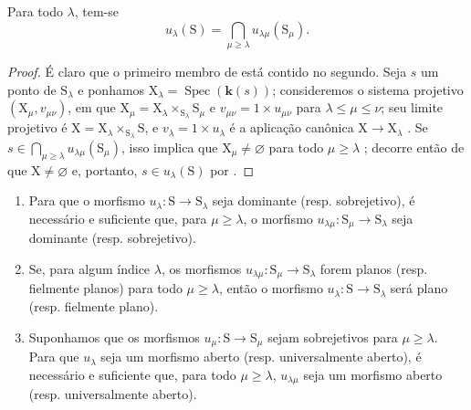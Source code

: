 \begin{corollary}[8.3.7]
\label{IV.8.3.7}
Para todo $\lambda$, tem-se
\begin{equation}
  u_\lambda(\mathrm{S})=\bigcap_{\mu\geqslant\lambda}u_{\lambda\mu}(\mathrm{S}_\mu).
  \tag{8.3.7.1}
\label{IV.8.3.7.1}
\end{equation}
\end{corollary}

\begin{proof}
É claro que o primeiro membro de  está contido no segundo.
Seja $s$ um ponto de $\mathrm{S}_\lambda$ e ponhamos $\mathrm{X}_\lambda=\operatorname{Spec}(\boldsymbol{k}(s))$; consideremos o sistema projetivo $(\mathrm{X}_\mu,v_{\mu\nu})$, em que $\mathrm{X}_\mu=\mathrm{X}_\lambda\times_{\mathrm{S}_\lambda}\mathrm{S}_\mu$ e $v_{\mu\nu}=1\times u_{\mu\nu}$ para $\lambda\leqslant\mu\leqslant\nu$; seu limite projetivo é $\mathrm{X}=\mathrm{X}_\lambda\times_{\mathrm{S}_\lambda}\mathrm{S}$, e $v_\lambda=1\times u_\lambda$ é a aplicação canônica $\mathrm{X}\to\mathrm{X}_\lambda$ .
Se $s\in\bigcap_{\mu\geqslant\lambda}u_{\lambda\mu}(\mathrm{S}_\mu)$, isso implica que $\mathrm{X}_\mu\neq\varnothing$ para todo $\mu\geqslant\lambda$ ; decorre então de  que $\mathrm{X}\neq\varnothing$ e, portanto, $s\in u_\lambda(\mathrm{S})$ por .
\end{proof}

\begin{proposition}[8.3.8]
\label{IV.8.3.8}
\begin{enumerate}[label=(\roman*)]
  \item Para que o morfismo $u_\lambda:\mathrm{S}\to\mathrm{S}_\lambda$ seja dominante (resp. sobrejetivo), é necessário e suficiente que, para $\mu\geqslant\lambda$, o morfismo $u_{\lambda\mu}:\mathrm{S}_\mu\to\mathrm{S}_\lambda$ seja dominante (resp. sobrejetivo).
  \item Se, para algum índice $\lambda$, os morfismos $u_{\lambda\mu}:\mathrm{S}_\mu\to\mathrm{S}_\lambda$ forem planos (resp. fielmente planos) para todo $\mu\geqslant\lambda$, então o morfismo $u_\lambda:\mathrm{S}\to\mathrm{S}_\lambda$ será plano (resp. fielmente plano).
  \item Suponhamos que os morfismos $u_\mu:\mathrm{S}\to\mathrm{S}_\mu$ sejam sobrejetivos para $\mu\geqslant\lambda$.
Para que $u_\lambda$ seja um morfismo aberto (resp. universalmente aberto), é necessário e suficiente que, para todo $\mu\geqslant\lambda$, $u_{\lambda\mu}$ seja um morfismo aberto (resp. universalmente aberto).
\end{enumerate}
\end{proposition}

